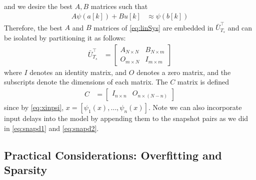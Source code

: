 and we desire the best $A,B$ matrices such that
\begin{align}
    A \psi(a[k]) + B u[k] &\approx \psi(b[k])
    \label{eq:linSys_psi}
\end{align}
Therefore, the best $A$ and $B$ matrices of \eqref{eq:linSys} are embedded in $\bar{U}_{T_s}^\top$ and can be isolated by partitioning it as follows:
\begin{align}
    \bar{U}_{T_s}^\top &= 
    \begin{bmatrix} 
        A_{N \times N} &
        B_{N \times m} \\
        O_{m \times N} &
        I_{m \times m}
    \end{bmatrix}
    \label{eq:AB}
\end{align}
where $I$ denotes an identity matrix, and $O$ denotes a zero matrix, and the subscripts denote the dimensions of each matrix.
The $C$ matrix is defined
\begin{align}
    C &= \begin{bmatrix} I_{n \times n} & O_{n \times (N-n)} \end{bmatrix}
    \label{eq:C}
\end{align}
since by \eqref{eq:xinpsi}, ${x = [ \psi_1(x) , \dots , \psi_n(x) ]}$.
Note we can also incorporate input delays into the model by appending them to the snapshot pairs as we did in \eqref{eq:snapd1} and \eqref{eq:snapd2}.





\subsection{Practical Considerations: Overfitting and Sparsity} \label{subsec:sparsity}


